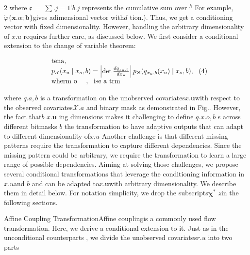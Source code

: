 \documentclass{article}
\begin{document}
\begin{paracol}{2}
where ${ \mathfrak { c } } ~ = ~ \sum . { j = 1 } ^ { \mathrm { i } } b . { j }$ represents the cumulative sum over
$^ { h }$ For example, ${ \dot { \varphi } } \{ { \pmb x } . { \alpha } ; { \pmb b } \}$gives adimensional vector with$d$
tion.). Thus, we get a conditioning vector with fixed dimensionality. However, handling the arbitrary dimensionality of
$x . { u }$ requires further care, as discussed below. We first consider a conditional extension to the change of variable theorem:


\begin{equation}
\begin{array} { r l } & { \mathrm { t e n a, ~ } } \\ & { p _ { \mathcal { X } } ( x _ { u } \mid x _ { o }, b ) = \left | \operatorname* { d e t } \frac { d q _ { x _ { u }, b } } { d x _ { u } } \right | p _ { \mathcal { Z } } ( q _ { x _ { u }, b } ( x _ { u } ) \mid x _ { o }, b ), ~ ~ ( 4 ) } \\ & { \mathrm { w h e r m ~ o ~ } \quad, ~ ~ \mathrm { i s e ~ a ~ t r m}}\end{array}
\end{equation}


where $q . { a, b }$ is a transformation on the unobserved covariates$x . { \mathbf { u } }$with respect to the observed covariates$\mathcal { X } . { a }$ and binary mask as demonstrated in Fig.. However, the fact that$b$
$x . { \mathbf { u } }$
ing dimensions makes it challenging to define $q . { x . { o }, b }$ s across
different bitmasks $b$
the transformation to have adaptive outputs that can adapt
to different dimensionality of$x . { u }$ Another challenge is that
 different missing patterns require the transformation to capture different dependencies. Since the missing pattern could
be arbitrary, we require the transformation to learn a large
range of possible dependencies. Aiming at solving those
challenges, we propose several conditional transformations
that leverage the conditioning information in$x . { u }$and $b$ and
can be adapted to$x . { \mathbf { u } }$with arbitrary dimensionality. We describe them in detail below. For notation simplicity, we drop
the subscripts$\boldsymbol { \chi } ^ { * }$ $z$in the following sections.


Affine Coupling TransformationAffine couplingis a
commonly used flow transformation. Here, we derive a conditional extension to it. Just as in the unconditional counterparts , we divide the unobserved covariates$r . { u }$ into two
parts

\end{paracol}
\end{document}
